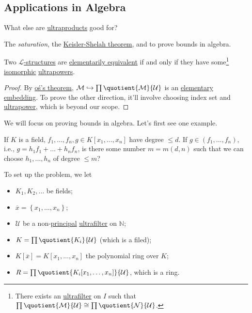 \subsection{Applications in Algebra}
\begin{problem}
What else are \hyperref[def:ultraproduct]{ultraproducts} good for?
\end{problem}
\begin{answer}
	The \emph{saturation}, the \hyperref[thm:Keisler-Shelah]{Keisler-Shelah theorem}, and to prove bounds in algebra.
\end{answer}

\begin{theorem}\label{thm:Keisler-Shelah}
	Two \hyperref[def:structure]{\(\mathcal{L} \)-structures} are \hyperref[def:elementarily-equivalent]{elementarily equivalent} if and only if they have some\footnote{There exists an \hyperref[def:ultrafilter]{ultrafilter} on \(I\) such that \(\prod \quotient{\mathcal{M} }{\mathcal{U} } \cong \prod \quotient{\mathcal{N} }{\mathcal{U} } \).} \hyperref[def:isomorphism]{isomorphic} \hyperref[def:ultrapower]{ultrapowers}.
\end{theorem}
\begin{proof}
	By \hyperref[thm:Los]{oś's theorem}, \(\mathcal{M} \hookrightarrow \prod \quotient{\mathcal{M} }{\mathcal{U} } \) is an \hyperref[def:elementary-embedding]{elementary embedding}. To prove the other direction, it'll involve choosing index set and \hyperref[def:ultrapower]{ultrapower}, which is beyond our scope.
\end{proof}

We will focus on proving bounds in algebra. Let's first see one example.

\begin{eg}
	If \(K\) is a field, \(f_1, \dots , f_n, g\in K[x_1, \dots , x_n]\) have degree \(\leq d\). If \(g \in (f_1, \dots , f_n)\), i.e., \(g = h_1 f_1 + \dots + h_n f_n\), is there some number \(m = m(d, n)\) such that we can choose \(h_1, \dots , h_n\) of degree \(\leq m\)?
\end{eg}

To set up the problem, we let
\begin{itemize}
	\item \(K_1, K_2, \dots \) be fields;
	\item \(\overline{x} = \left\{ x_1, \dots , x_n \right\} \);
	\item \(\mathcal{U} \) be a non-\hyperref[eg:principal-filter]{principal} \hyperref[def:ultrafilter]{ultrafilter} on \(\mathbb{N} \);
	\item \(K = \prod \quotient{K_i}{\mathcal{U} } \) (which is a filed);
	\item \(K[\overline{x} ] = K[x_1, \dots , x_n]\) the polynomial ring over \(K\);
	\item \(R = \prod \quotient{K_i[x_1, \dots , x_n]}{\mathcal{U} } \), which is a ring.
\end{itemize}

